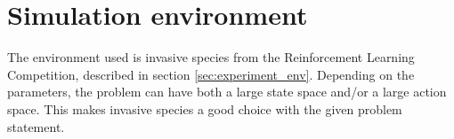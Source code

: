 \section{Simulation environment}
\label{sec:env_used}
The environment used is invasive species from the Reinforcement Learning Competition, described in section \ref{sec:experiment_env}. Depending on the parameters, the problem can have both a large state space and/or a large action space. This makes invasive species a good choice with the given problem statement.

